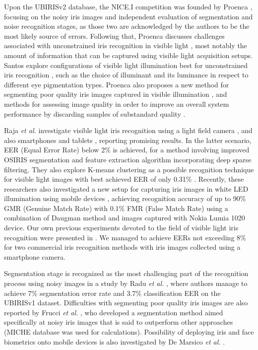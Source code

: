 \documentclass[10pt,twocolumn,letterpaper]{article}
\begin{document}
Upon the UBIRISv2 database, the NICE.I competition was founded by Proenca \etal \cite{NICE1}, focusing on the noisy iris images and independent evaluation of segmentation and noise recognition stages, as those two are acknowledged by the authors to be the most likely source of errors. Following that, Proenca discusses challenges associated with unconstrained iris recognition in visible light \cite{ProencaFeasibility}, most notably the amount of information that can be captured using visible light acquisition setups. Santos \etal explore configurations of visible light illumination best for unconstrained iris recognition \cite{SantosPreliminaryAssessment}, such as the choice of illuminant and its luminance in respect to different eye pigmentation types. Proenca also proposes a new method for segmenting poor quality iris images captured in visible illumination \cite{ProencaVisibleSegmentation}, and methods for assessing image quality in order to improve an overall system performance by discarding samples of substandard quality \cite{ProencaVisibleQuality}.

Raja \emph{et al.} investigate visible light iris recognition using a light field camera \cite{KiranLightField2013}, and also smartphones and tablets \cite{KiranSparse2014}, reporting promising results. In the latter scenario, EER (Equal Error Rate) below 2\%  is achieved, for a method involving improved OSIRIS segmentation and feature extraction algorithm incorporating deep sparse filtering. They also explore K-means clustering as a possible recognition technique for visible light images with best achieved EER of only 0.31\% \cite{KiranKmeans}. Recently, these researchers also investigated a new setup for capturing iris images in white LED illumination using mobile devices \cite{KiranBTAS2015}, achieving recognition accuracy of up to 90\% GMR (Genuine Match Rate) with 0.1\% FMR (False Match Rate) using a combination of Daugman method and images captured with Nokia Lumia 1020 device. Our own previous experiments devoted to the field of visible light iris recognition were presented in \cite{TrokielewiczWilga2015}. We managed to achieve EERs not exceeding 8\% for two commercial iris recognition methods with iris images collected using a smartphone camera. 

Segmentation stage is recognized as the most challenging part of the recognition process using noisy images in a study by Radu \emph{et al.} \cite{RaduColorIrisRecognition2013}, where authors manage to achieve 7\% segmentation error rate and 3.7\% classification EER on the UBIRISv1 dataset. Difficulties with segmenting poor quality iris images are also reported by Frucci \emph{et al.} \cite{IDEM2014}, who developed a segmentation method aimed specifically at noisy iris images that is said to outperform other approaches (MICHE database was used for calculations). Possibility of deploying iris and face biometrics onto mobile devices is also investigated by De Marsico \emph{et al.} \cite{FIRMEfaceIrisApp2014}. 
\end{document}
